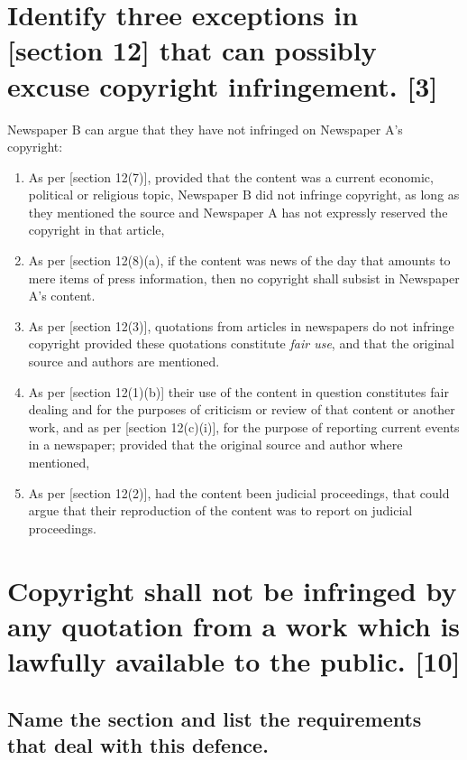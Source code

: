 \documentclass[11pt]{article}
\begin{document}
\section{Identify three exceptions in [section 12]\cite{rsa78_copyrightact} that can possibly excuse copyright infringement. [3]}
\label{sec:org2e91687}
Newspaper B can argue that they have not infringed on Newspaper A's copyright:
\begin{enumerate}
\item As per [section 12(7)]\cite{rsa78_copyrightact}, provided that the content
was a current economic, political or religious topic, Newspaper B did not
infringe copyright, as long as they mentioned the source and Newspaper A
has not expressly reserved the copyright in that article,
\item As per [section 12(8)(a), if the content was news of the day that amounts
to mere items of press information, then no copyright shall subsist in
Newspaper A's content.
\item As per [section 12(3)]\cite{rsa78_copyrightact}, quotations from articles in
newspapers do not infringe copyright provided these quotations constitute
\emph{fair use}, and that the original source and authors are mentioned.
\item As per [section 12(1)(b)]\cite{rsa78_copyrightact} their use of the content
in question constitutes fair dealing and for the purposes of criticism or
review of that content or another work, and as per [section
12(c)(i)]\cite{rsa78_copyrightact}, for the purpose of reporting current
events in a newspaper; provided that the original source and author where mentioned,
\item As per [section 12(2)]\cite{rsa78_copyrightact}, had the content been judicial proceedings, that could argue that their reproduction of the content was to report on judicial proceedings.
\end{enumerate}

\section{Copyright shall not be infringed by any quotation from a work which is lawfully available to the public. [10]}
\label{sec:org4e78030}
\subsection{Name the section and list the requirements that deal with this defence. \label{subsec:defence_public_quotations}}
\label{sec:orgb877cc9}
\end{document}

